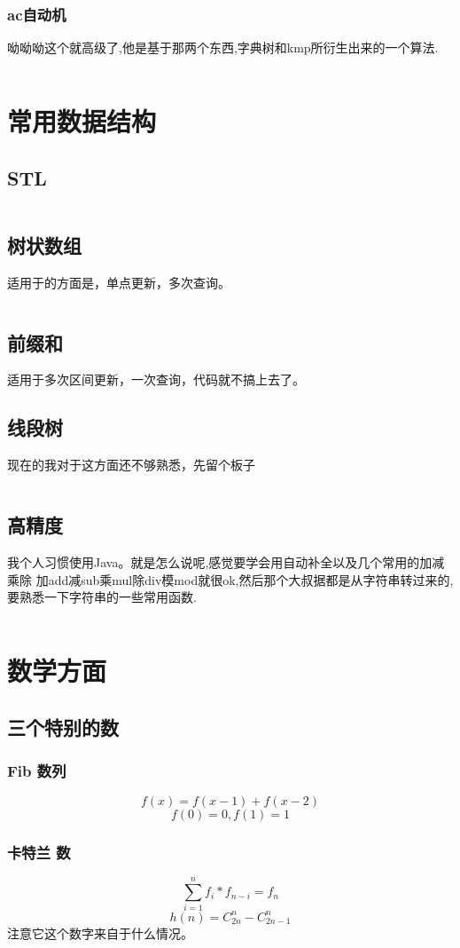 \documentclass[a4paper,11pt]{article}
\begin{document}
\begin{CJK}{UTF8}{gbsn}
\subsubsection{ac自动机}
呦呦呦这个就高级了,他是基于那两个东西,字典树和kmp所衍生出来的一个算法.
\inputminted{c++}{../scoure/date/aczidongji.cpp}
\section{常用数据结构}
\subsection{STL}
\inputminted{c++}{../scoure/date/duilie.cpp}
\subsection{树状数组}
适用于的方面是，单点更新，多次查询。
\inputminted{c++}{../scoure/date/treevector.cpp}
\subsection{前缀和}
适用于多次区间更新，一次查询，代码就不搞上去了。
\subsection{线段树}
现在的我对于这方面还不够熟悉，先留个板子
\inputminted{c++}{../scoure/date/treexian.cpp}
\subsection{高精度}
我个人习惯使用Java。就是怎么说呢,感觉要学会用自动补全以及几个常用的加减乘除
加add减sub乘mul除div模mod就很ok,然后那个大叔据都是从字符串转过来的,要熟悉一下字符串的一些常用函数.
\inputminted{java}{../scoure/date/bigjing.java}
\section{数学方面}
\subsection{三个特别的数}
\subsubsection{Fib 数列}
$$f(x) = f(x-1)+f(x-2)$$
$$f(0) = 0,f(1) = 1$$
\subsubsection{卡特兰 数}
$$\sum_{i=1}^n f_i*f_{n-i}=f_n$$
$$h(n) = C_{2n}^n - C_{2n-1}^{n}$$
注意它这个数字来自于什么情况。

\end{CJK}
\end{document}
